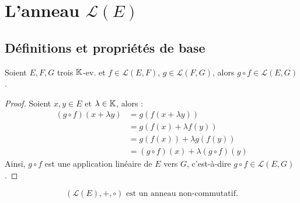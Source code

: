 \documentclass[12pt, a4paper]{report}
\begin{document}
\section{L'anneau $\mathcal L(E)$}

\subsection{Définitions et propriétés de base}

\begin{property}
    Soient $E,F,G$ trois $\mathbb{K}$-ev. et $f \in \mathcal L(E,F)$, $g \in \mathcal L(F,G)$, alors $g \circ f \in \mathcal L(E,G)$.
\end{property}

\begin{proof}
    Soient $x,y \in E$ et $\lambda \in \mathbb{K}$, alors :
    \begin{align*}
        (g \circ f)(x + \lambda y) &= g(f(x + \lambda y))\\
        &= g(f(x) + \lambda f(y))\\
        &= g(f(x)) + \lambda g(f(y))\\
        &= (g \circ f)(x) + \lambda (g \circ f)(y)
    \end{align*}
    Ainsi, $g \circ f$ est une application linéaire de $E$ vers $G$, c'est-à-dire $g \circ f \in \mathcal L(E,G)$.
\end{proof}

\begin{property}
    $$(\mathcal L(E), +, \circ) \text{ est un anneau non-commutatif.}$$
\end{property}
\end{document}

